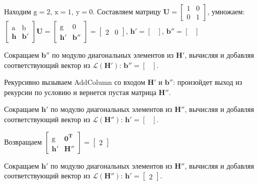 \begin{enumerate}
\begin{itemize}
Находим $ \mathrm{g} = 2 $, $ \mathrm{x} = 1 $, $ \mathrm{y} = 0 $. Составляем матрицу $  \mathbf{U} = \left[\begin{array}{cccc}
1 & 0 \\
0 & 1
\end{array}\right] $, умножаем: $ \left[ \begin{array}{cccc}
\mathrm{a} & \mathrm{b} \\
\mathbf{h} & \mathbf{b}' \end{array} \right] \mathbf{U}=
\left[ \begin{array}{cccc}
\mathrm{g} & \mathrm{0} \\
\mathbf{h}' & \mathbf{b}'' \end{array} \right] = \left[\begin{array}{cccc}
2 & 0
\end{array}\right] $, $ \mathbf{h}' = \left[\begin{array}{cccc}
\end{array}\right] $, $ \mathbf{b}'' = \left[\begin{array}{cccc}
\end{array}\right] $

Сокращаем $ \mathbf{b}'' $ по модулю диагональных элементов из $ \mathbf{H}' $, вычисляя и добавляя соответствующий вектор из $ \mathcal{L}(\mathbf{H}') $: $ \mathbf{b}'' = \left[ \begin{array}{cccc}
\end{array}\right] $.

Рекурсивно вызываем AddColumn со входом $ \mathbf{H}' $ и $ \mathbf{b}'' $: произойдет выход из рекурсии по условию и вернется пустая матрица $ \mathbf{H}'' $.

Сокращаем $ \mathbf{h}' $ по модулю диагональных элементов из $ \mathbf{H}'' $, вычисляя и добавляя соответствующий вектор из $ \mathcal{L}(\mathbf{H}'') $: $ \mathbf{h}' = \left[ \begin{array}{cccc}
\end{array}\right] $.

Возвращаем $ \left[\begin{array}{cccc}
\mathrm{g} & \mathbf{0}^\mathbf{T} \\
\mathbf{h}' & \mathbf{H}''
\end{array}\right] = \left[\begin{array}{cccc}
2
\end{array}\right] $
\end{itemize}

Сокращаем $ \mathbf{h}' $ по модулю диагональных элементов из $ \mathbf{H}'' $, вычисляя и добавляя соответствующий вектор из $ \mathcal{L}(\mathbf{H}'') $: $ \mathbf{h}' = \left[ \begin{array}{cccc}
2
\end{array}\right] $.


\end{enumerate}
